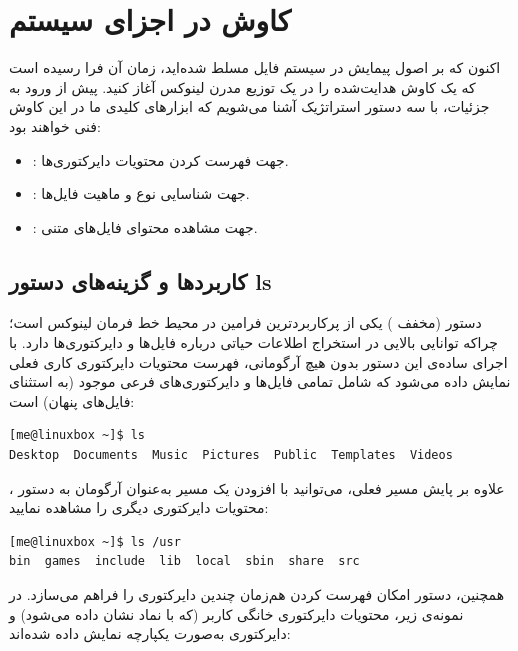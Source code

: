 \chapter{کاوش در اجزای سیستم}

اکنون که بر اصول پیمایش در سیستم فایل مسلط شده‌اید، زمان آن فرا رسیده است که یک کاوش هدایت‌شده را در یک توزیع مدرن لینوکس آغاز کنید. پیش از ورود به جزئیات، با سه دستور استراتژیک آشنا می‌شویم که ابزارهای کلیدی ما در این کاوش فنی خواهند بود:

\begin{itemize}
  \item {}: جهت فهرست کردن محتویات دایرکتوری‌ها.
  \item {}: جهت شناسایی نوع و ماهیت فایل‌ها.
  \item {}: جهت مشاهده محتوای فایل‌های متنی.
\end{itemize}

\section{کاربردها و گزینه‌های دستور ls}

دستور  (مخفف ) یکی از پرکاربردترین فرامین در محیط خط فرمان لینوکس است؛ چراکه توانایی بالایی در استخراج اطلاعات حیاتی درباره فایل‌ها و دایرکتوری‌ها دارد. با اجرای ساده‌ی این دستور بدون هیچ آرگومانی، فهرست محتویات دایرکتوری کاری فعلی نمایش داده می‌شود که شامل تمامی فایل‌ها و دایرکتوری‌های فرعی موجود (به استثنای فایل‌های پنهان) است:

\begin{latin}
\begin{lstlisting}
[me@linuxbox ~]$ ls
Desktop  Documents  Music  Pictures  Public  Templates  Videos
\end{lstlisting}
\end{latin}

علاوه بر پایش مسیر فعلی، می‌توانید با افزودن یک مسیر به‌عنوان آرگومان به دستور ، محتویات دایرکتوری دیگری را مشاهده نمایید:

\begin{latin}
\begin{lstlisting}
[me@linuxbox ~]$ ls /usr
bin  games  include  lib  local  sbin  share  src
\end{lstlisting}
\end{latin}

همچنین، دستور  امکان فهرست کردن هم‌زمان چندین دایرکتوری را فراهم می‌سازد. در نمونه‌ی زیر، محتویات دایرکتوری خانگی کاربر (که با نماد \cmd{\textasciitilde} نشان داده می‌شود) و دایرکتوری  به‌صورت یکپارچه نمایش داده شده‌اند:

